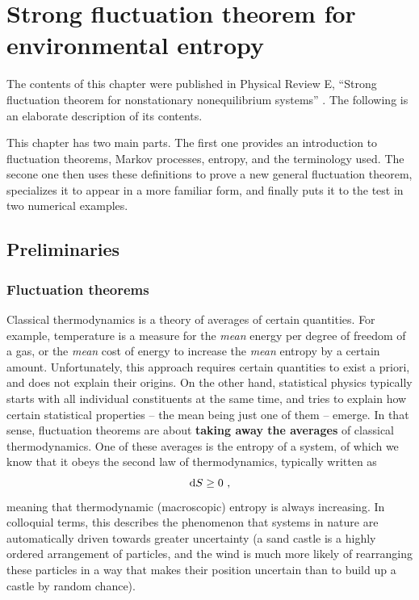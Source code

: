 \chapter{Strong fluctuation theorem for environmental entropy}
\label{chap:thingie}

The contents of this chapter were published in Physical Review E, ``Strong fluctuation theorem for nonstationary nonequilibrium systems'' \cite{thingie-paper}. The following is an elaborate description of its contents.

This chapter has two main parts. The first one provides an introduction to fluctuation theorems, Markov processes, entropy, and the terminology used. The secone one then uses these definitions to prove a new general fluctuation theorem, specializes it to appear in a more familiar form, and finally puts it to the test in two numerical examples.


\section{Preliminaries}



\subsection{Fluctuation theorems}

Classical thermodynamics is a theory of averages of certain quantities. For example, temperature is a measure for the \emph{mean} energy per degree of freedom of a gas, or the \emph{mean} cost of energy to increase the \emph{mean} entropy by a certain amount. Unfortunately, this approach requires certain quantities to exist a priori, and does not explain their origins. On the other hand, statistical physics typically starts with all individual constituents at the same time, and tries to explain how certain statistical properties -- the mean being just one of them -- emerge. In that sense, fluctuation theorems are about \textbf{taking away the averages} of classical thermodynamics. One of these averages is the entropy of a system, of which we know that it obeys the second law of thermodynamics, typically written as
%
\begin{equation}
	\label{eqn:2nd_law_classical}
	\mathrm{d} S \geq 0 ~,
\end{equation}
%
meaning that thermodynamic (macroscopic) entropy is always increasing. In colloquial terms, this describes the phenomenon that systems in nature are automatically driven towards greater uncertainty (a sand castle is a highly ordered arrangement of particles, and the wind is much more likely of rearranging these particles in a way that makes their position uncertain than to build up a castle by random chance).

